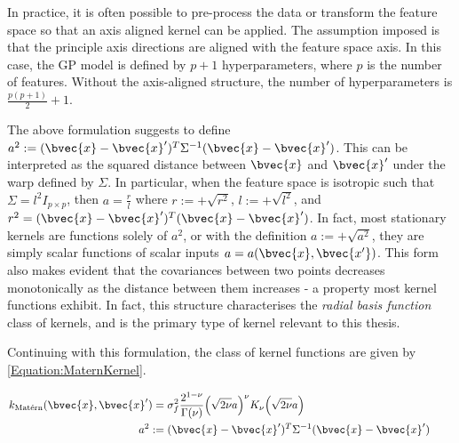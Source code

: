 				In practice, it is often possible to pre-process the data or transform the feature space so that an axis aligned kernel can be applied. The assumption imposed is that the principle axis directions are aligned with the feature space axis. In this case, the GP model is defined by $p + 1$ hyperparameters, where $p$ is the number of features. Without the axis-aligned structure, the number of hyperparameters is $\frac{p(p + 1)}{2} + 1$.
				
				The above formulation suggests to define $a^{2} := (\bvec{x} - \bvec{x}')^{T} \Sigma^{-1} (\bvec{x} - \bvec{x}')$. This can be interpreted as the squared distance between $\bvec{x}$ and $\bvec{x}'$ under the warp defined by $\Sigma$. In particular, when the feature space is isotropic such that $\Sigma = l^{2} I_{p \times p}$, then $a = \frac{r}{l}$ where $r := +\sqrt{r^{2}}$, $l := +\sqrt{l^{2}}$, and $r^{2} = (\bvec{x} - \bvec{x}')^{T} (\bvec{x} - \bvec{x}')$. In fact, most stationary kernels are functions solely of $a^{2}$, or with the definition $a := +\sqrt{a^{2}}$, they are simply scalar functions of scalar inputs $a = a (\bvec{x}, \bvec{x'})$. This form also makes evident that the covariances between two points decreases monotonically as the distance between them increases - a property most kernel functions exhibit. In fact, this structure characterises the \textit{radial basis function} class of kernels, and is the primary type of kernel relevant to this thesis.
				
				Continuing with this formulation, the \matern class of kernel functions are given by \eqref{Equation:MaternKernel}.
				
				\begin{equation}
					\left.
						\begin{aligned}
							k_{\mathrm{\maternmath}}(\bvec{x}, \bvec{x}') =& \; \sigma_{f}^{2} \frac{2^{1 - \nu}}{\Gamma(\nu)} \Big( \sqrt{2 \nu} a \Big)^{\nu} K_{\nu}\Big( \sqrt{2 \nu} a \Big) \\
							a^{2} :=& \; (\bvec{x} - \bvec{x}')^{T} \Sigma^{-1} (\bvec{x} - \bvec{x}')
						\end{aligned}
					\qquad \right.
				\label{Equation:MaternKernel}
				\end{equation}
							

